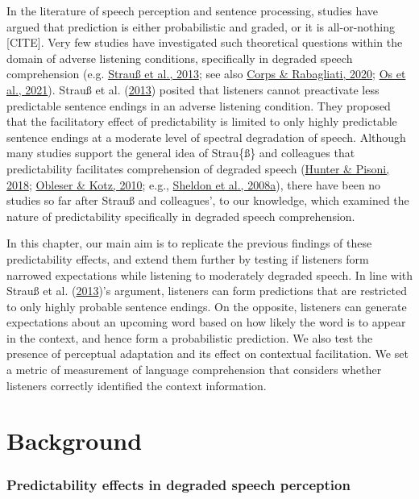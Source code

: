 \documentclass[a4paper, nobind]{templates/ociamthesis}
\begin{document}
In the literature of speech perception and sentence processing, studies have argued that prediction is either probabilistic and graded, or it is all-or-nothing {[}CITE{]}.
Very few studies have investigated such theoretical questions within the domain of adverse listening conditions, specifically in degraded speech comprehension (e.g. \protect\hyperlink{ref-Strauss2013}{Strauß et al., 2013}; see also \protect\hyperlink{ref-Corps2020}{Corps \& Rabagliati, 2020}; \protect\hyperlink{ref-vanOs2021}{Os et al., 2021}).
Strauß et al. (\protect\hyperlink{ref-Strauss2013}{2013}) posited that listeners cannot preactivate less predictable sentence endings in an adverse listening condition.
They proposed that the facilitatory effect of predictability is limited to only highly predictable sentence endings at a moderate level of spectral degradation of speech.
Although many studies support the general idea of Strau\{\ss\} and colleagues that predictability facilitates comprehension of degraded speech (\protect\hyperlink{ref-Hunter2018}{Hunter \& Pisoni, 2018}; \protect\hyperlink{ref-Obleser2010}{Obleser \& Kotz, 2010}; e.g., \protect\hyperlink{ref-Sheldon2008a}{Sheldon et al., 2008a}),
there have been no studies so far after Strauß and colleagues', to our knowledge, which examined the nature of predictability specifically in degraded speech comprehension.

In this chapter, our main aim is to replicate the previous findings of these predictability effects,
and extend them further by testing if listeners form narrowed expectations while listening to moderately degraded speech.
In line with Strauß et al. (\protect\hyperlink{ref-Strauss2013}{2013})'s argument, listeners can form predictions that are restricted to only highly probable sentence endings.
On the opposite, listeners can generate expectations about an upcoming word based on how likely the word is to appear in the context,
and hence form a probabilistic prediction.
We also test the presence of perceptual adaptation and its effect on contextual facilitation.
We set a metric of measurement of language comprehension that considers whether listeners correctly identified the context information.

\hypertarget{background-1}{%
\section{Background}\label{background-1}}

\hypertarget{predictability-effects-in-degraded-speech-perception}{%
\subsubsection{Predictability effects in degraded speech perception}\label{predictability-effects-in-degraded-speech-perception}}
\end{document}
